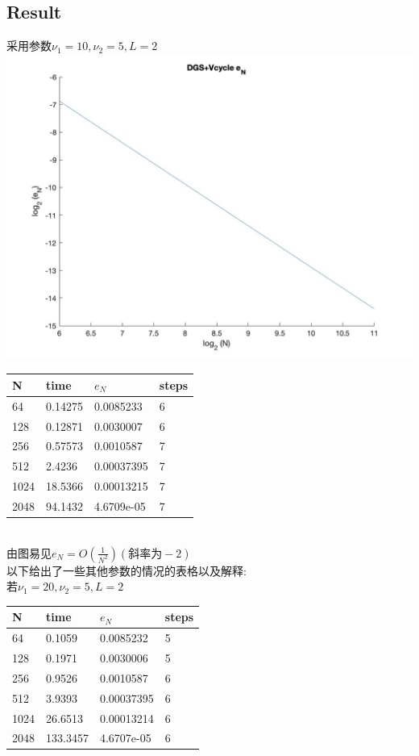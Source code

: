 \documentclass{article}
\begin{document}
\subsection{Result}
采用参数$\nu_1=10,\nu_2=5,L=2$\\
\includegraphics[scale=0.3]{image/DGS.jpg}\\
\begin{tabular}{llll}
N & time & $e_N$ & steps \\ 
\hline 
64 & 0.14275 & 0.0085233 & 6 \\ 
128 & 0.12871 & 0.0030007 & 6 \\ 
256 & 0.57573 & 0.0010587 & 7 \\ 
512 & 2.4236 & 0.00037395 & 7 \\ 
1024 & 18.5366 & 0.00013215 & 7 \\ 
2048 & 94.1432 & 4.6709e-05 & 7 \\ 
\hline 
\end{tabular}\\
由图易见$e_N=O(\frac{1}{N^2})(斜率为-2)$\\
以下给出了一些其他参数的情况的表格以及解释:\\
若$\nu_1=20,\nu_2=5,L=2$\\
\begin{tabular}{llll}
N & time & $e_N$ & steps \\ 
\hline 
64 & 0.1059 & 0.0085232 & 5 \\ 
128 & 0.1971 & 0.0030006 & 5 \\ 
256 & 0.9526 & 0.0010587 & 6 \\ 
512 & 3.9393 & 0.00037395 & 6 \\ 
1024 & 26.6513 & 0.00013214 & 6 \\ 
2048 & 133.3457 & 4.6707e-05 & 6 \\ 
\hline 
\end{tabular}\\
\end{document}
